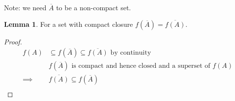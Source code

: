 \documentclass[11pt,a4paper]{article}
\theoremstyle{definition}
\newtheorem{lemma}[theorem]{Lemma}
\begin{document}
Note: we need $\overline{A}$ to be a non-compact set.

\begin{lemma}
For a set with compact closure $f(\overline{A}) = \overline{f(A)}$.
\end{lemma}

\begin{proof}
\begin{align*}
f(A) &\subseteq f(\overline{A}) \subseteq \overline{f(A)} \text{ by continuity} \\
&f(\overline{A}) \text{ is compact and hence closed and a superset of } f(A) \\
\implies &\overline{f(A)} \subseteq f(\overline{A}) \\\end{align*}
\end{proof}
\end{document}
